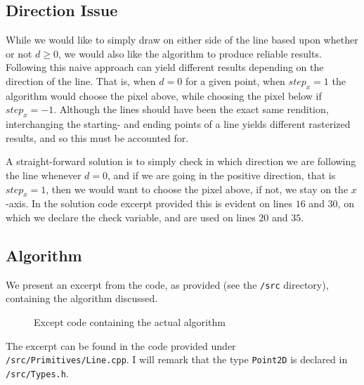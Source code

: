 \documentclass[11pt]{article}
\begin{document}
\subsection{Direction Issue}
While we would like to simply draw on either side of the line based upon
whether or not $d \geq 0$, we would also like the algorithm to produce
reliable results. Following this naive approach can yield different results
depending on the direction of the line. That is, when $d = 0$ for a given
point, when $step_x = 1$ the algorithm would choose the pixel above, while
choosing the pixel below if $step_x = -1$. Although the lines should have been
the exact same rendition, interchanging the starting- and ending points of a
line yields different rasterized results, and so this must be accounted for.

A straight-forward solution is to simply check in which direction we are
following the line whenever $d = 0$, and if we are going in the positive
direction, that is $step_x = 1$, then we would want to choose the pixel above,
if not, we stay on the $x$-axis. In the solution code excerpt provided this is
evident on lines $16$ and $30$, on which we declare the check variable, and
are used on lines $20$ and $35$.

\newpage
\subsection{Algorithm}
We present an excerpt from the code, as provided (see the {\tt /src}
directory), containing the algorithm discussed.
\begin{figure}[H]
    
    \label{fig:code-excerpt}
    \caption{Except code containing the actual algorithm}
\end{figure}
The excerpt can be found in the code provided under
{\tt /src/Primitives/Line.cpp}. I will remark that the type {\tt Point2D} is
declared in {\tt /src/Types.h}.

\newpage
\end{document}

